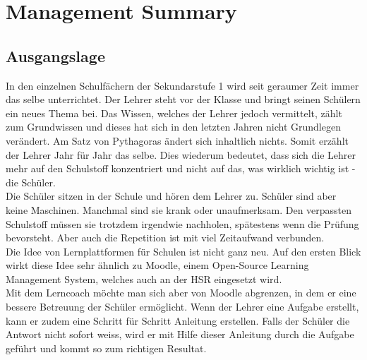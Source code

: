 \section*{Management Summary}

\subsection*{Ausgangslage}
In den einzelnen Schulfächern der Sekundarstufe 1 wird seit geraumer Zeit immer das selbe unterrichtet. Der Lehrer steht vor der Klasse und bringt seinen Schülern ein neues Thema bei. Das Wissen, welches der Lehrer jedoch vermittelt, zählt zum Grundwissen und dieses hat sich in den letzten Jahren nicht Grundlegen verändert. Am Satz von Pythagoras ändert sich inhaltlich nichts. Somit erzählt der Lehrer Jahr für Jahr das selbe. Dies wiederum bedeutet, dass sich die Lehrer mehr auf den Schulstoff konzentriert und nicht auf das, was wirklich wichtig ist - die Schüler. \\

\noindent Die Schüler sitzen in der Schule und hören dem Lehrer zu. Schüler sind aber keine Maschinen. Manchmal sind sie krank oder unaufmerksam. Den verpassten Schulstoff müssen sie trotzdem irgendwie nachholen, spätestens wenn die Prüfung bevorsteht. Aber auch die Repetition ist mit viel Zeitaufwand verbunden. \\

\noindent Die Idee von Lernplattformen für Schulen ist nicht ganz neu. Auf den ersten Blick wirkt diese Idee sehr ähnlich zu Moodle, einem Open-Source Learning Management System, welches auch an der HSR eingesetzt wird. \\

\noindent Mit dem Lerncoach möchte man sich aber von Moodle abgrenzen, in dem er eine bessere Betreuung der Schüler ermöglicht. Wenn der Lehrer eine Aufgabe erstellt, kann er zudem eine Schritt für Schritt Anleitung erstellen. Falls der Schüler die Antwort nicht sofort weiss, wird er mit Hilfe dieser Anleitung durch die Aufgabe geführt und kommt so zum richtigen Resultat. 


